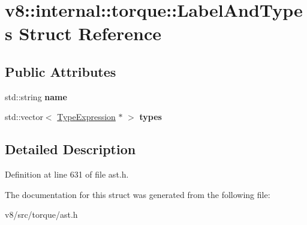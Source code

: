 \hypertarget{structv8_1_1internal_1_1torque_1_1LabelAndTypes}{}\section{v8\+:\+:internal\+:\+:torque\+:\+:Label\+And\+Types Struct Reference}
\label{structv8_1_1internal_1_1torque_1_1LabelAndTypes}
\subsection*{Public Attributes}
\begin{DoxyCompactItemize}
\item 
\mbox{\label{structv8_1_1internal_1_1torque_1_1LabelAndTypes_a26e2d8742e3d383c5c7182081a399a76}} 
std\+::string {\bfseries name}
\item 
\mbox{\label{structv8_1_1internal_1_1torque_1_1LabelAndTypes_a03ba7dbff86aada49eb3d9182b08e3e8}} 
std\+::vector$<$ \mbox{\hyperlink{structv8_1_1internal_1_1torque_1_1TypeExpression}{Type\+Expression}} $\ast$ $>$ {\bfseries types}
\end{DoxyCompactItemize}


\subsection{Detailed Description}


Definition at line 631 of file ast.\+h.



The documentation for this struct was generated from the following file\+:\begin{DoxyCompactItemize}
\item 
v8/src/torque/ast.\+h\end{DoxyCompactItemize}
